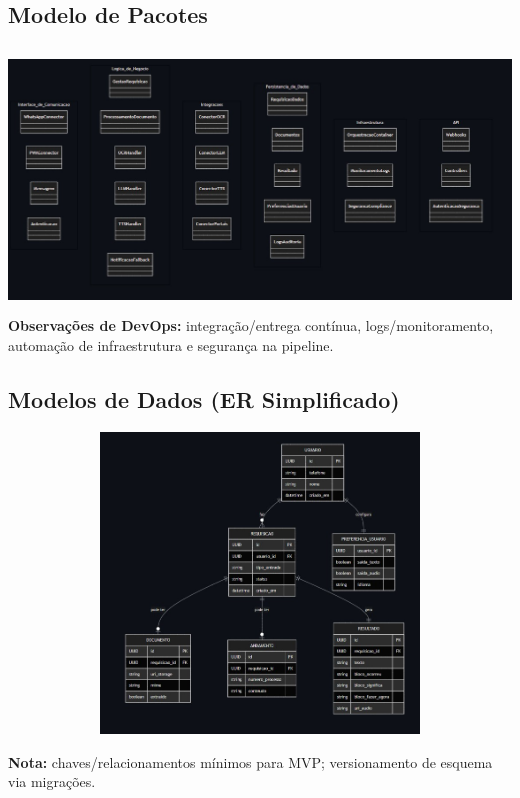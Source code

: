 \documentclass{article}
\begin{document}
\subsection{Modelo de Pacotes}
\includegraphics[width=1.4\textwidth,height=7cm,keepaspectratio]{images/Modelo-de-Pacotes.jpg}
\textbf{Observações de DevOps: } integração/entrega contínua, logs/monitoramento, automação de infraestrutura e segurança na pipeline.

\newpage

\subsection{Modelos de Dados (ER Simplificado)}
\includegraphics[width=3\textwidth,height=8cm,keepaspectratio]{images/Modelo-de-Dados.jpg}

\textbf{Nota:} chaves/relacionamentos mínimos para MVP; versionamento de esquema via migrações.
\end{document}
